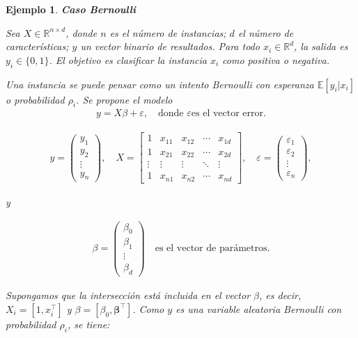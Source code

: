 \documentclass[12pt]{article}
\newtheorem{Ejem}{Ejemplo}%
\begin{document}
\begin{Ejem}\textbf{Caso Bernoulli}

Sea $X \in \mathbb{R}^{n \times d}$, donde $n$ es el  número de instancias; $d$ el  número de características; $y$ un vector binario de resultados. Para todo $x_i \in \mathbb{R}^d$, la salida es $y_i \in \{0,1\}$. El objetivo es clasificar la instancia $x_i$ como positiva o negativa.

\medskip

Una instancia se puede pensar como un intento Bernoulli con esperanza $\mathbb{E}[y_i | x_i]$ o probabilidad $\rho_i$. Se propone el modelo
\begin{eqnarray*}
y = X \beta + \varepsilon, \quad \text{donde }\varepsilon \text{es el vector error}.
\end{eqnarray*}

\begin{eqnarray*}
y = 
\begin{pmatrix}
y_1 \\
y_2 \\
\vdots \\
y_n
\end{pmatrix},
\quad
X = 
\begin{bmatrix}
1 & x_{11} & x_{12} & \cdots & x_{1d} \\
1 & x_{21} & x_{22} & \cdots & x_{2d} \\
\vdots & \vdots & \vdots & \ddots & \vdots \\
1 & x_{n1} & x_{n2} & \cdots & x_{nd}
\end{bmatrix},
\quad
\varepsilon = 
\begin{pmatrix}
\varepsilon_1 \\
\varepsilon_2 \\
\vdots \\
\varepsilon_n
\end{pmatrix},
\end{eqnarray*}

y

\begin{eqnarray*}
\beta = 
\begin{pmatrix}
\beta_0 \\
\beta_1 \\
\vdots \\
\beta_d
\end{pmatrix}
\quad \text{es el vector de parámetros.}
\end{eqnarray*}

Supongamos que la intersección está incluida en el vector $\beta$, es decir, $X_i = [1, x_i^\top]$ y
$\beta = [\beta_0, \boldsymbol{\beta}^\top]$.  Como $y$ es una variable aleatoria Bernoulli con probabilidad $\rho_i$, se tiene:


\end{Ejem}
\end{document}
